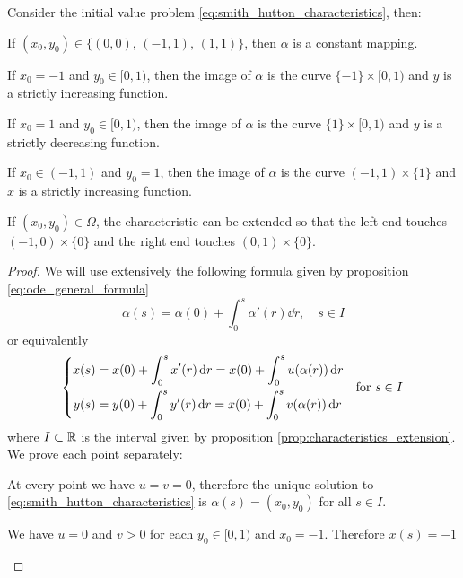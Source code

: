 \begin{prop}
	Consider the initial value problem \eqref{eq:smith_hutton_characteristics}, then:
	\begin{enumerateprop}
		\item If $(x_0, y_0) \in \{ (0,0), \, (-1,1), \, (1,1) \}$, then
		$\alpha$ is a constant mapping.
		\item If $x_0 = -1$ and $y_0 \in [0, 1)$, then the image of $\alpha$ is
		the curve $\{ - 1 \} \times [0, 1)$ and $y$ is a
		strictly increasing function.
		\item If $x_0 = 1$ and  $y_0 \in [0,1)$, then the image of $\alpha$ is
		the curve $\{ 1 \} \times [0, 1)$ and $y$ is a strictly
		decreasing function.
		\item If $x_0 \in (-1,1)$ and $y_0 = 1$, then the image of $\alpha$ is
		the curve $(-1,1) \times \{ 1 \}$ and $x$ is a strictly increasing function.
		\item If $(x_0,y_0) \in \Omega$, the characteristic can be extended so
		that the left end touches $(-1,0) \times \{ 0 \}$ and the right end touches $(0,1) \times \{ 0 \}$.
	\end{enumerateprop}
\end{prop}
\begin{proof}
	We will use extensively the following formula given by proposition \ref{eq:ode_general_formula}
	\begin{equation*}
		\alpha(s) = \alpha(0) + \int_0^s \alpha'(r) \dd{r}, \quad s \in I
	\end{equation*}
	or equivalently
	\begin{equation*}
		\left\{
			\begin{aligned}
				x(s) &= x(0) + \int_0^s x'(r) \dd{r} = 
				x(0) + \int_0^s u(\alpha(r)) \dd{r} \\
				y(s) &= y(0) + \int_0^s y'(r) \dd{r} = 
				x(0) + \int_0^s v(\alpha(r)) \dd{r}
			\end{aligned}
			\quad \text{for } s \in I \\
		\right.
	\end{equation*}
	where $I \subset \mathbb{R}$ is the interval given by proposition
	\ref{prop:characteristics_extension}. We prove each point separately:
	\begin{enumerateprop}
		\item At every point we have $u = v = 0$, therefore the unique solution
		to \eqref{eq:smith_hutton_characteristics} is $\alpha(s) = (x_0, y_0)$
		for all $s \in I$.
		\item We have $u = 0$ and $v > 0$ for each $y_0 \in [0,1)$ and $x_0 =
		-1$. Therefore $x(s) = -1$ 
	\end{enumerateprop}
\end{proof}


